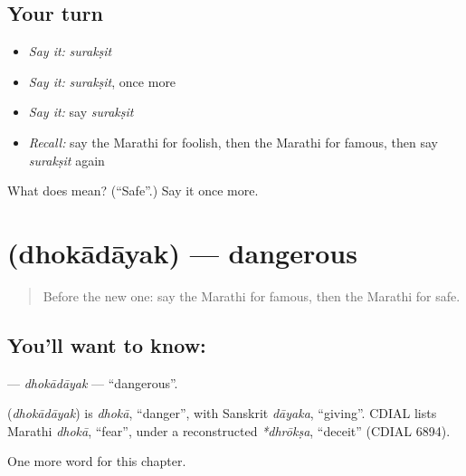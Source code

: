 \subsection*{Your turn}
\begin{itemize}
\raggedright
  \item \emph{Say it:} \emph{surakṣit}
  \item \emph{Say it:} \emph{surakṣit}, once more
  \item \emph{Say it:} say \emph{surakṣit}
  \item \emph{Recall:} say the Marathi for foolish, then the Marathi for famous, then say \emph{surakṣit} again
\end{itemize}

\begin{tcolorbox}[breakable,colback=teal!4,colframe=teal!35!black,title={Before you move on}]
What does  mean? (\textquotedblleft{}Safe\textquotedblright{}.) Say it once more.
\end{tcolorbox}
\section[\texorpdfstring{\mr{धोकादायक} (dhokādāyak)}{धोकादायक (dhokādāyak)}]{ (dhokādāyak) — dangerous}

\label{lesson:MR-C152-dhokadayak}



\begin{quote}
Before the new one: say the Marathi for famous, then the Marathi for safe.
\end{quote}

\subsection*{You'll want to know: }
\textbf{} — \emph{dhokādāyak} — \textquotedblleft{}dangerous\textquotedblright{}.

\begin{cousinweb}
\textbf{} (\emph{dhokādāyak}) is \emph{dhokā}, \textquotedblleft{}danger\textquotedblright{}, with Sanskrit \emph{dāyaka}, \textquotedblleft{}giving\textquotedblright{}. CDIAL lists Marathi \emph{dhokā}, \textquotedblleft{}fear\textquotedblright{}, under a reconstructed \emph{*dhrōkṣa}, \textquotedblleft{}deceit\textquotedblright{} (CDIAL 6894).
\end{cousinweb}

\begin{grammarlens}[title={What you've built}]
One more word for this chapter.
\end{grammarlens}

